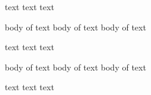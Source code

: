 text text text
\begin{myenv}
	body of text
	body of text
	body of text \end{myenv}text text text

\begin{cmh}
	body of text
	body of text
	body of text
\end{cmh}
text text text
